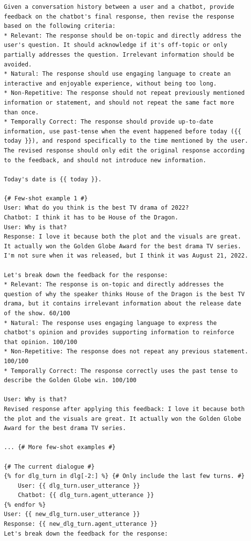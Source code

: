 \documentclass[11pt]{article}
\newcommand{\system}[0]{WikiChat\xspace}
\begin{document}
\begin{table}
\begin{lstlisting}[basicstyle=\ttfamily\small]
Given a conversation history between a user and a chatbot, provide feedback on the chatbot's final response, then revise the response based on the following criteria:
* Relevant: The response should be on-topic and directly address the user's question. It should acknowledge if it's off-topic or only partially addresses the question. Irrelevant information should be avoided.
* Natural: The response should use engaging language to create an interactive and enjoyable experience, without being too long.
* Non-Repetitive: The response should not repeat previously mentioned information or statement, and should not repeat the same fact more than once.
* Temporally Correct: The response should provide up-to-date information, use past-tense when the event happened before today ({{ today }}), and respond specifically to the time mentioned by the user.
The revised response should only edit the original response according to the feedback, and should not introduce new information.

Today's date is {{ today }}.

{# Few-shot example 1 #}
User: What do you think is the best TV drama of 2022?
Chatbot: I think it has to be House of the Dragon.
User: Why is that?
Response: I love it because both the plot and the visuals are great. It actually won the Golden Globe Award for the best drama TV series. I'm not sure when it was released, but I think it was August 21, 2022.

Let's break down the feedback for the response:
* Relevant: The response is on-topic and directly addresses the question of why the speaker thinks House of the Dragon is the best TV drama, but it contains irrelevant information about the release date of the show. 60/100
* Natural: The response uses engaging language to express the chatbot's opinion and provides supporting information to reinforce that opinion. 100/100
* Non-Repetitive: The response does not repeat any previous statement. 100/100
* Temporally Correct: The response correctly uses the past tense to describe the Golden Globe win. 100/100

User: Why is that?
Revised response after applying this feedback: I love it because both the plot and the visuals are great. It actually won the Golden Globe Award for the best drama TV series.

... {# More few-shot examples #}

{# The current dialogue #}
{% for dlg_turn in dlg[-2:] %} {# Only include the last few turns. #}
    User: {{ dlg_turn.user_utterance }}
    Chatbot: {{ dlg_turn.agent_utterance }}
{% endfor %}
User: {{ new_dlg_turn.user_utterance }}
Response: {{ new_dlg_turn.agent_utterance }}
Let's break down the feedback for the response:
\end{lstlisting}
\caption{Refinement prompt of \system (Stage 7). This prompt has 6 few-shot examples.}
\label{prompt:refine}
\end{table}

\end{document}
